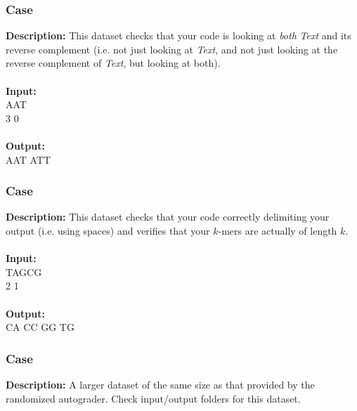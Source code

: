 \documentclass{article}
\newcommand{\code}[1]{{\fontfamily{pcr}\selectfont #1}}
\begin{document}
\subsubsection*{Case }
\hline \vspace{5}
\textbf{Description:} This dataset checks that your code is looking at \emph{both} \emph{Text} and its reverse complement (i.e. not just looking at \emph{Text}, and not just looking at the reverse complement of \emph{Text}, but looking at both).\\ \\
\noindent \textbf{Input:}\\
\code{AAT\\3 0}\\ \\
\noindent \textbf{Output:}\\
\code{AAT ATT}

\subsubsection*{Case }
\hline \vspace{5}
\textbf{Description:} This dataset checks that your code correctly delimiting your output (i.e. using spaces) and
verifies that your $k$-mers are actually of length $k$.\\ \\
\noindent \textbf{Input:}\\
\code{TAGCG\\2 1}\\ \\
\noindent \textbf{Output:}\\
\code{CA CC GG TG}

\subsubsection*{Case }
\hline \vspace{5}
\textbf{Description:} A larger dataset of the same size as that provided by the randomized autograder. Check input/output folders for this dataset.\\ \\
\pagebreak
\end{document}
